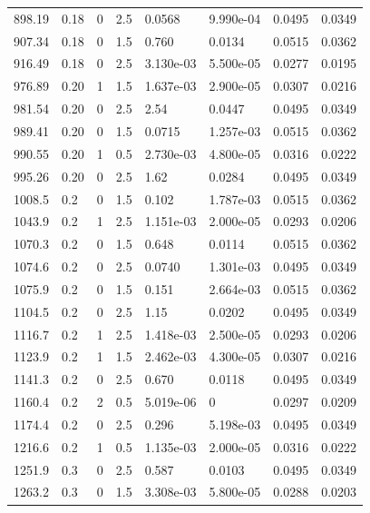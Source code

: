 \documentclass[preview]{standalone}
\begin{document}
{{{\begin{tabular}{L{1.2cm}C{1.2cm} C{0.3cm}C{0.5cm} C{1.4cm}C{1.4cm} C{1.4cm}C{1.4cm}}
  898.19  &  0.18  & 0     & 2.5 &  0.0568  & 9.990e-04  & 0.0495 &  0.0349   \\ 
  907.34  &  0.18  & 0     & 1.5 &  0.760  & 0.0134  & 0.0515 &  0.0362   \\ 
  916.49  &  0.18  & 0     & 2.5 &  3.130e-03  & 5.500e-05  & 0.0277 &  0.0195   \\ 
  976.89  &  0.20  & 1     & 1.5 &  1.637e-03  & 2.900e-05  & 0.0307 &  0.0216   \\ 
  981.54  &  0.20  & 0     & 2.5 &  2.54  & 0.0447  & 0.0495 &  0.0349   \\ 
  989.41  &  0.20  & 0     & 1.5 &  0.0715  & 1.257e-03  & 0.0515 &  0.0362   \\ 
  990.55  &  0.20  & 1     & 0.5 &  2.730e-03  & 4.800e-05  & 0.0316 &  0.0222   \\ 
  995.26  &  0.20  & 0     & 2.5 &  1.62  & 0.0284  & 0.0495 &  0.0349   \\ 
  1008.5  &   0.2  & 0     & 1.5 &  0.102  & 1.787e-03  & 0.0515 &  0.0362   \\ 
  1043.9  &   0.2  & 1     & 2.5 &  1.151e-03  & 2.000e-05  & 0.0293 &  0.0206   \\ 
  1070.3  &   0.2  & 0     & 1.5 &  0.648  & 0.0114  & 0.0515 &  0.0362   \\ 
  1074.6  &   0.2  & 0     & 2.5 &  0.0740  & 1.301e-03  & 0.0495 &  0.0349   \\ 
  1075.9  &   0.2  & 0     & 1.5 &  0.151  & 2.664e-03  & 0.0515 &  0.0362   \\ 
  1104.5  &   0.2  & 0     & 2.5 &  1.15  & 0.0202  & 0.0495 &  0.0349   \\ 
  1116.7  &   0.2  & 1     & 2.5 &  1.418e-03  & 2.500e-05  & 0.0293 &  0.0206   \\ 
  1123.9  &   0.2  & 1     & 1.5 &  2.462e-03  & 4.300e-05  & 0.0307 &  0.0216   \\ 
  1141.3  &   0.2  & 0     & 2.5 &  0.670  & 0.0118  & 0.0495 &  0.0349   \\ 
  1160.4  &   0.2  & 2     & 0.5 &  5.019e-06  & 0  & 0.0297 &  0.0209   \\ 
  1174.4  &   0.2  & 0     & 2.5 &  0.296  & 5.198e-03  & 0.0495 &  0.0349   \\ 
  1216.6  &   0.2  & 1     & 0.5 &  1.135e-03  & 2.000e-05  & 0.0316 &  0.0222   \\ 
  1251.9  &   0.3  & 0     & 2.5 &  0.587  & 0.0103  & 0.0495 &  0.0349   \\ 
  1263.2  &   0.3  & 0     & 1.5 &  3.308e-03  & 5.800e-05  & 0.0288 &  0.0203   \\ 

\end{tabular}}}}
\end{document}
